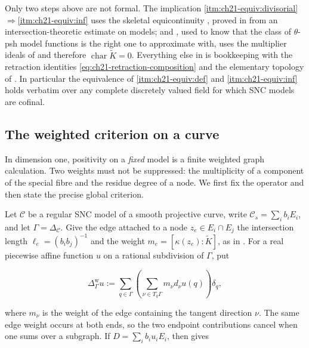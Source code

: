 \begin{remark}
\label{rem:ch21-which-deep}
Only two steps above are not formal.  The implication
\cref{itm:ch21-equiv:divisorial}$\Rightarrow$\cref{itm:ch21-equiv:inf} uses the
skeletal equicontinuity , proved in
 from an intersection-theoretic estimate on
models; and , used to know that the class
of $\theta$-psh model functions is the right one to approximate with, uses
the multiplier ideals of  and therefore
$\operatorname{char}\widetilde K=0$.  Everything else in
 is bookkeeping with the retraction identities
\eqref{eq:ch21-retraction-composition} and the elementary topology of
.  In particular the equivalence of
\cref{itm:ch21-equiv:def} and \cref{itm:ch21-equiv:inf} holds verbatim over any
complete discretely valued field for which SNC models are cofinal.
\end{remark}

\subsection{The weighted criterion on a curve}
\label{sec:ch21-equivalent-curve}

In dimension one, positivity on a \emph{fixed} model is a finite weighted
graph calculation.  Two weights must not be suppressed: the multiplicity of
a component of the special fibre and the residue degree of a node.  We first
fix the operator and then state the precise global criterion.

Let $\mathcal C$ be a regular SNC model of a smooth projective curve, write
$\mathcal C_s=\sum_i b_iE_i$, and let $\Gamma=\Delta_{\mathcal C}$.
Give the edge attached to a node $z_e\in E_i\cap E_j$ the intersection
length $\ell_e=(b_ib_j)^{-1}$ and the weight
$m_e=[\kappa(z_e):\widetilde K]$, as in
.  For a real piecewise affine function
$u$ on a rational subdivision of $\Gamma$, put

\begin{equation}
\label{eq:ch21-weighted-graph-laplacian}
 \Delta^{\mathrm w}_{\Gamma}u
 :=\sum_{q\in\Gamma}
   \left(\sum_{\nu\in T_q\Gamma}m_\nu d_\nu u(q)\right)\delta_q,
\end{equation}

where $m_\nu$ is the weight of the edge containing the tangent direction
$\nu$.  The same edge weight occurs at both ends, so the two endpoint
contributions cancel when one sums over a subgraph.  If
$D=\sum_i b_iu_iE_i$, then
 gives

